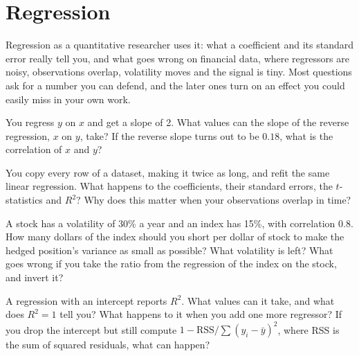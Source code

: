 \chapter{Regression}\label{ch:iv1:regression}

\begin{ivtrains}
Regression as a quantitative researcher uses it: what a coefficient and its standard error really tell you, and what goes wrong on
financial data, where regressors are noisy, observations overlap, volatility moves and the signal is tiny. Most questions ask for
a number you can defend, and the later ones turn on an effect you could easily miss in your own work.
\end{ivtrains}

\begin{question}\label{iq:iv1:regression:1}
You regress $y$ on $x$ and get a slope of 2. What values can the slope of the reverse regression, $x$ on $y$, take? If the reverse slope turns out to be $0.18$, what is the correlation of $x$ and $y$?
\end{question}

\begin{question}\label{iq:iv1:regression:2}
You copy every row of a dataset, making it twice as long, and refit the same linear regression. What happens to the coefficients, their standard errors, the $t$-statistics and $R^2$? Why does this matter when your observations overlap in time?
\end{question}

\begin{question}\label{iq:iv1:regression:3}
A stock has a volatility of 30\% a year and an index has 15\%, with correlation $0.8$. How many dollars of the index should you short per dollar of stock to make the hedged position's variance as small as possible? What volatility is left? What goes wrong if you take the ratio from the regression of the index on the stock, and invert it?
\end{question}

\begin{question}\label{iq:iv1:regression:4}
A regression with an intercept reports $R^2$. What values can it take, and what does $R^2 = 1$ tell you? What happens to it when you add one more regressor? If you drop the intercept but still compute $1 - \text{RSS}/\sum (y_i - \bar y)^2$, where RSS is the sum of squared residuals, what can happen?
\end{question}


